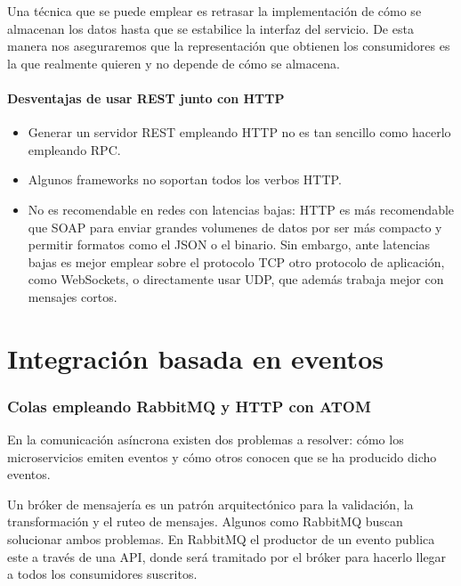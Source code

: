 \documentclass[11pt,a4paper]{article}
\begin{document}
Una técnica que se puede emplear es retrasar la implementación de cómo se almacenan los datos hasta que se estabilice la interfaz del servicio. De esta manera nos aseguraremos que la representación que obtienen los consumidores es la que realmente quieren y no depende de cómo se almacena.

\subsection{Desventajas de usar REST junto con HTTP}

\begin{itemize}

\item Generar un servidor REST empleando HTTP no es tan sencillo como hacerlo empleando RPC.

\item Algunos frameworks no soportan todos los verbos HTTP.

\item No es recomendable en redes con latencias bajas: HTTP es más recomendable que SOAP para enviar grandes volumenes de datos por ser más compacto y permitir formatos como el JSON o el binario. Sin embargo, ante latencias bajas es mejor emplear sobre el protocolo TCP otro protocolo de aplicación, como WebSockets, o directamente usar UDP, que además trabaja mejor con mensajes cortos.

\end{itemize}

\part{Integración basada en eventos}

\section{Colas empleando RabbitMQ y HTTP con ATOM}

En la comunicación asíncrona existen dos problemas a resolver: cómo los microservicios emiten eventos y cómo otros conocen que se ha producido dicho eventos.

Un bróker de mensajería es un patrón arquitectónico para la validación, la transformación y el ruteo de mensajes. Algunos como RabbitMQ buscan solucionar ambos problemas. En RabbitMQ el productor de un evento publica este a través de una API, donde será tramitado por el bróker para hacerlo llegar a todos los consumidores suscritos. 
\end{document}
